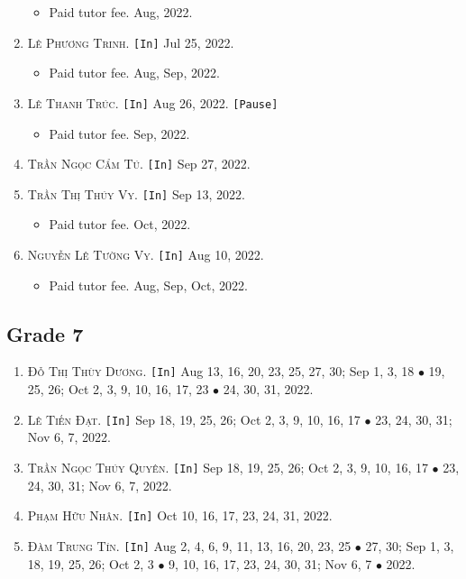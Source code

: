 \documentclass{article}
\numberwithin{equation}{section}
\begin{document}
\begin{enumerate}
	\begin{itemize}
		\item \textsf{Paid tutor fee.} Aug, 2022.
	\end{itemize}
	\item \textsc{Lê Phương Trinh.} \texttt{[In]} Jul 25, 2022.
	\begin{itemize}
		\item \textsf{Paid tutor fee.} Aug, Sep, 2022.
	\end{itemize}
	\item \textsc{Lê Thanh Trúc.} \texttt{[In]} Aug 26, 2022. \texttt{[Pause]}
	\begin{itemize}
		\item \textsf{Paid tutor fee.} Sep, 2022.
	\end{itemize}
	\item \textsc{Trần Ngọc Cẩm Tú.} \texttt{[In]} Sep 27, 2022.
	\item \textsc{Trần Thị Thúy Vy.} \texttt{[In]} Sep 13, 2022.
	\begin{itemize}
		\item \textsf{Paid tutor fee.} Oct, 2022.
	\end{itemize}
	\item \textsc{Nguyễn Lê Tường Vy.} \texttt{[In]} Aug 10, 2022.
	\begin{itemize}
		\item \textsf{Paid tutor fee.} Aug, Sep, Oct, 2022.
	\end{itemize}
\end{enumerate}

\subsection{Grade 7}
\begin{enumerate}
	\item \textsc{Đỗ Thị Thùy Dương.} \texttt{[In]} Aug 13, 16, 20, 23, 25, 27, 30; Sep 1, 3, 18 $\bullet$ 19, 25, 26; Oct 2, 3, 9, 10, 16, 17, 23 $\bullet$ 24, 30, 31, 2022.
	\item \textsc{Lê Tiến Đạt.} \texttt{[In]} Sep 18, 19, 25, 26; Oct 2, 3, 9, 10, 16, 17 $\bullet$ 23, 24, 30, 31; Nov 6, 7, 2022.
	\item \textsc{Trần Ngọc Thúy Quyên.} \texttt{[In]} Sep 18, 19, 25, 26; Oct 2, 3, 9, 10, 16, 17 $\bullet$ 23, 24, 30, 31; Nov 6, 7, 2022.
	\item \textsc{Phạm Hữu Nhân.} \texttt{[In]} Oct 10, 16, 17, 23, 24, 31, 2022.
	\item \textsc{Đàm Trung Tín.} \texttt{[In]} Aug 2, 4, 6, 9, 11, 13, 16, 20, 23, 25 $\bullet$ 27, 30; Sep 1, 3, 18, 19, 25, 26; Oct 2, 3 $\bullet$ 9, 10, 16, 17, 23, 24, 30, 31; Nov 6, 7 $\bullet$ 2022.
\end{enumerate}
\end{document}
